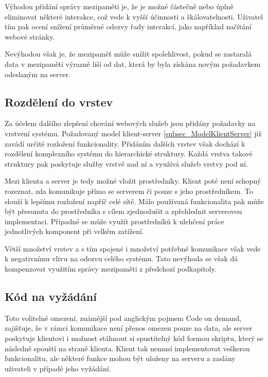 Výhodou přidání správy mezipaměti je, že je možné částečně nebo úplně eliminovat některé interakce, což vede k vyšší účinnosti a škálovatelnosti. Uživatel tím pak ocení snížení průměrné odezvy řady interakcí, jako například načítání webové stránky. 

Nevýhodou však je, že mezipaměť může snížit spolehlivost, pokud se zastaralá data v mezipaměti výrazně liší od dat, která by byla získána novým požadavkem odeslaným na server.


\subsection*{Rozdělení do vrstev}
\label{subsec_RozdeleniDoVrtev}

Za účelem dalšího zlepšení chování webových služeb jsou přidány požadavky na vrstvení systému. Požadovaný model klient-server \ref{subsec_ModelKlientServer} již zavádí určité rozložení funkcionality. Přidáním dalších vrstev však dochází k rozdělení komplexního systému do hierarchické struktury. Každá vrstva takové struktury pak poskytuje služby vrstvě nad ní a využívá služeb vrstvy pod ní.

Mezi klienta a server je tedy možné vložit prostředníky. Klient poté není schopný rozeznat, zda komunikuje přímo se serverem či pouze s jeho prostředníkem. To slouží k lepšímu rozložení napříč celé sítě. Málo používaná funkcionalita pak může být přesunuta do prostředníka s cílem zjednodušit a zpřehlednit serverovou implementaci. Případně se může využít prostředníků k ulehčení práce jednotlivých komponent při velkém zatížení. 

Větší množství vrstev a s tím spojené i množství potřebné komunikace však vede k negativnímu vlivu na odezvu celého systému. Tato nevýhoda se však dá kompenzovat využitím správy mezipaměti z předchozí podkapitoly.

\subsection*{Kód na vyžádání}
\label{subsec_CodeOnDemand}

Toto volitelné omezení, známější pod anglickým pojmem Code on demand, zajišťuje, že v rámci komunikace není přenos omezen pouze na data, ale server poskytuje klientovi i možnost stáhnout si spustitelný kód formou skriptu, který se následně spouští na straně klienta. Klient tak nemusí implementovat veškerou funkcionalitu, ale některé funkce mohou být uloženy na serveru a zaslány uživateli v případě jeho vyžádání.

